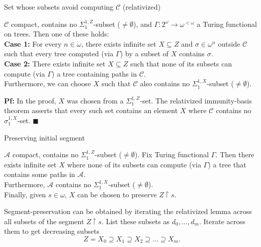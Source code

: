 \begin{frame}{Set whose subsets avoid computing $\mathcal{C}$ (relativized)}
  \begin{lemma}[Relativized]
    $\mathcal{C}$ compact, contains no $\Sigma_1^{1,Z}$-subset
    ($\neq\emptyset$), and $\Gamma:2^{\omega}\rightarrow \omega^{<\omega}$
    a Turing functional on trees. Then one of these holds:\\
    \vspace{0.5em}
    \textbf{Case 1:} For every $n\in\omega$, there exists infinite set
    $X\subseteq Z$ and $\sigma\in\omega^n$ outside $\mathcal{C}$ such that
    every tree computed (via $\Gamma$) by a subset of $X$ contains
    $\sigma$.\\
    \vspace{0.5em}
    \textbf{Case 2:} There exists infinite set $X\subseteq Z$ such that
    none of its subsets can compute (via $\Gamma$) a tree containing paths
    in $\mathcal{C}$.\\
    \vspace{0.5em}
    Furthermore, we can choose $X$ such that $\mathcal{C}$ also contains no
    $\Sigma_1^{1,X}$-subset ($\neq\emptyset$).
  \end{lemma}

  \textbf{Pf:} In the proof, $X$ was chosen from a $\Sigma_1^{1,Z}$-set.
  The relativized immunity-basis theorem asserts that every such set
  contains an element $X$ where $\mathcal{C}$ contains no
  $\sigma_1^{1,X}$-set. $\blacksquare$
\end{frame}

\begin{frame}{Preserving initial segment}
  \begin{lemma}
    $\mathcal{A}$ compact, contains no $\Sigma_1^{1,Z}$-subset
    ($\neq\emptyset$). Fix Turing functional $\Gamma$. Then there exists
    infinite set $X$ where none of its subsets can compute (via $\Gamma$) a
    tree that contains some paths in $\mathcal{A}$.\\
    \vspace{0.5em}
    Furthermore, $\mathcal{A}$ contains no $\Sigma_1^{1,X}$-subset
    ($\neq\emptyset$).\\
    \vspace{0.5em}
    Finally, given $s\in\omega$, $X$ can be chosen to preserve
    $Z\restriction s$.
  \end{lemma}

  \vspace{0.5em}
  Segment-preservation can be obtained by iterating the relativized lemma
  across all subsets of the segment $Z\restriction s$. List these subsets
  as $d_0,\ldots,d_m$. Iterate across them to get decreasing subsets
  \[Z=X_0 \supseteq X_1 \supseteq X_2 \supseteq\ldots \supseteq X_m.\]
\end{frame}


